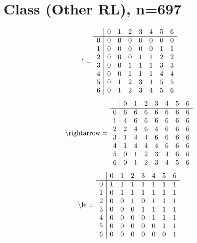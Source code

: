 \documentclass[11pt]{article}
\begin{document}
\section{Class (Other RL), n=697}
\[\text{*} = 
\begin{array}{r | r r r r r r r}
 & 0 & 1 & 2 & 3 & 4 & 5 & 6 \\ \hline
0 & 0 & 0 & 0 & 0 & 0 & 0 & 0 \\
1 & 0 & 0 & 0 & 0 & 0 & 1 & 1 \\
2 & 0 & 0 & 0 & 1 & 1 & 2 & 2 \\
3 & 0 & 0 & 1 & 1 & 1 & 3 & 3 \\
4 & 0 & 0 & 1 & 1 & 1 & 4 & 4 \\
5 & 0 & 1 & 2 & 3 & 4 & 5 & 5 \\
6 & 0 & 1 & 2 & 3 & 4 & 5 & 6 \\
\end{array}
\]
\[\text{\textbackslash rightarrow} = 
\begin{array}{r | r r r r r r r}
 & 0 & 1 & 2 & 3 & 4 & 5 & 6 \\ \hline
0 & 6 & 6 & 6 & 6 & 6 & 6 & 6 \\
1 & 4 & 6 & 6 & 6 & 6 & 6 & 6 \\
2 & 2 & 4 & 6 & 4 & 6 & 6 & 6 \\
3 & 1 & 4 & 4 & 6 & 6 & 6 & 6 \\
4 & 1 & 4 & 4 & 4 & 6 & 6 & 6 \\
5 & 0 & 1 & 2 & 3 & 4 & 6 & 6 \\
6 & 0 & 1 & 2 & 3 & 4 & 5 & 6 \\
\end{array}
\]
\[\text{\textbackslash le} = 
\begin{array}{r | r r r r r r r}
 & 0 & 1 & 2 & 3 & 4 & 5 & 6 \\ \hline
0 & 1 & 1 & 1 & 1 & 1 & 1 & 1 \\
1 & 0 & 1 & 1 & 1 & 1 & 1 & 1 \\
2 & 0 & 0 & 1 & 0 & 1 & 1 & 1 \\
3 & 0 & 0 & 0 & 1 & 1 & 1 & 1 \\
4 & 0 & 0 & 0 & 0 & 1 & 1 & 1 \\
5 & 0 & 0 & 0 & 0 & 0 & 1 & 1 \\
6 & 0 & 0 & 0 & 0 & 0 & 0 & 1 \\
\end{array}
\]
\end{document}
